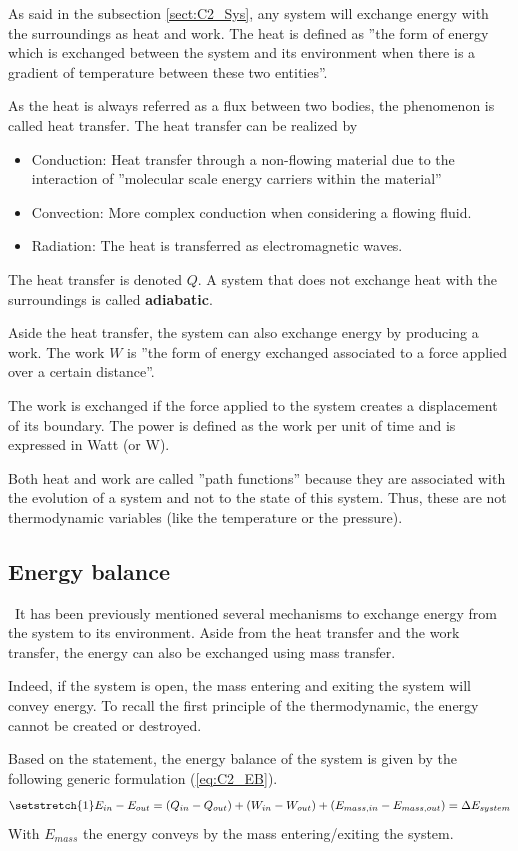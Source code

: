 As said in the subsection \ref{sect:C2_Sys}, any system will exchange energy with the surroundings as heat and work. The heat is defined as ''the form of energy which is exchanged between the system and its environment when there is a gradient of temperature between these two entities''. 

As the heat is always referred as a flux between two bodies, the phenomenon is called heat transfer. The heat transfer can be realized by
\begin{itemize}
    \item Conduction: Heat transfer through a non-flowing material due to the interaction of ''molecular scale energy carriers within the material''\cite{GregoryNellis2015}
    \item Convection: More complex conduction when considering a flowing fluid.
    \item Radiation: The heat is transferred as electromagnetic waves.
\end{itemize}
The heat transfer is denoted $Q$. A system that does not exchange heat with the surroundings is called \textbf{adiabatic}.

Aside the heat transfer, the system can also exchange energy by producing a work. The work $W$ is ''the form of energy exchanged associated to a force applied over a certain distance''. 

The work is exchanged if the force applied to the system creates a displacement of its boundary. The power is defined as the work per unit of time and is expressed in Watt (or W).

Both heat and work are called ''path functions'' because they are associated with the evolution of a system and not to the state of this system. Thus, these are not thermodynamic variables (like the temperature or the pressure).
\subsection{Energy balance}
\quad\, It has been previously mentioned several mechanisms to exchange energy from the system to its environment. Aside from the heat transfer and the work transfer, the energy can also be exchanged using mass transfer. 

Indeed, if the system is open, the mass entering and exiting the system will convey energy. To recall the first principle of the thermodynamic, the energy cannot be created or destroyed. 

Based on the statement, the energy balance of the system is given by the following generic formulation (\ref{eq:C2_EB}).
\begin{equation}
\setstretch{1}
    E_{in} - E_{out} = (Q_{in} - Q_{out}) + (W_{in} - W_{out}) + (E_{mass,in} - E_{mass,out}) = \Delta E_{system} \label{eq:C2_EB}
\end{equation}
With $E_{mass}$ the energy conveys by the mass entering/exiting the system.

